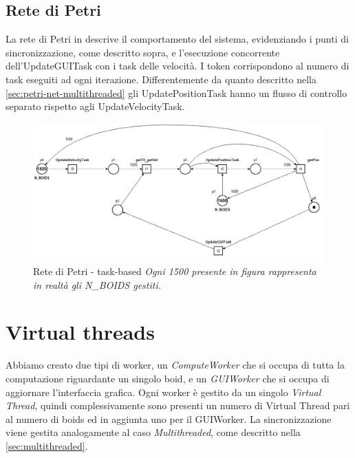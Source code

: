 \documentclass[a4paper,12pt]{report}
\begin{document}
\subsection{Rete di Petri}
La rete di Petri in  descrive il comportamento del sistema, evidenziando i punti di sincronizzazione, come descritto sopra, e l'esecuzione concorrente dell'UpdateGUITask con i task delle velocità. I token corrispondono al numero di task eseguiti ad ogni iterazione.
Differentemente da quanto descritto nella \cref{sec:petri-net-multithreaded} gli UpdatePositionTask hanno un flusso di controllo separato rispetto agli UpdateVelocityTask.
\begin{figure}[H]
    \centering
    \includegraphics[width=\linewidth]{figures/tasks.png}
    \caption{\centering Rete di Petri - task-based \newline \textit{Ogni 1500 presente in figura rappresenta in realtà gli N\_BOIDS gestiti.}}
    \label{fig:petri-net-task-based}
\end{figure}
\section{Virtual threads}
Abbiamo creato due tipi di worker, un \textit{ComputeWorker} che si occupa di tutta la computazione riguardante un singolo boid, e un \textit{GUIWorker} che si occupa di aggiornare l'interfaccia grafica. Ogni worker è gestito da un singolo \textit{Virtual Thread}, quindi complessivamente sono presenti un numero di Virtual Thread pari al numero di boids ed in aggiunta uno per il GUIWorker. La sincronizzazione viene gestita analogamente al caso \textit{Multithreaded}, come descritto nella \cref{sec:multithreaded}.
\end{document}
